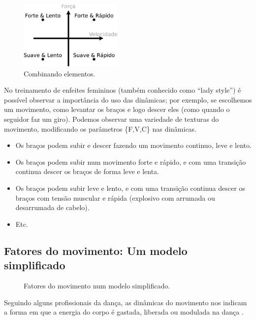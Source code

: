 \begin{figure}[!h]
  \centering
    \includegraphics[width=0.45\textwidth]{chapters/cap-musicalidade/dinamicas-elementos2.eps}
\caption{Combinando elementos.}
\label{fig:element:moviment2}
\end{figure}

\begin{example}
No treinamento de enfeites femininos (também conhecido como ``lady style'')
é possível observar a importância do uso das dinâmicas;
por exemplo, se escolhemos um movimento, 
como levantar os braços e logo descer eles (como quando o seguidor faz um giro).
Podemos observar uma variedade de texturas do movimento,
modificando os parâmetros  \{F,V,C\} nas dinâmicas.
\begin{itemize}
\item Os braços podem subir e descer fazendo um movimento continuo, leve e lento.
\item Os braços podem subir num movimento forte e rápido,
e com uma transição continua descer os braços de forma leve e lenta.
\item Os braços podem subir leve e lento,
e com uma transição continua descer os braços com tensão muscular e rápida 
(explosivo com arrumada ou desarrumada de cabelo). 
\item Etc.
\end{itemize}
\end{example}

\subsection{Fatores do movimento: Um modelo simplificado}

\begin{figure}
\centering
{} 
\caption{Fatores do movimento num modelo simplificado.}
\label{fig:fatores:moviemnto:simplificada}
\end{figure}
Seguindo alguns profissionais  da dança, 
as dinâmicas do movimento nos indicam a forma em que a energia do corpo
é gastada, liberada ou modulada na dança \cite[pp. 126, 131, 136]{mccutchen2006teaching}.

